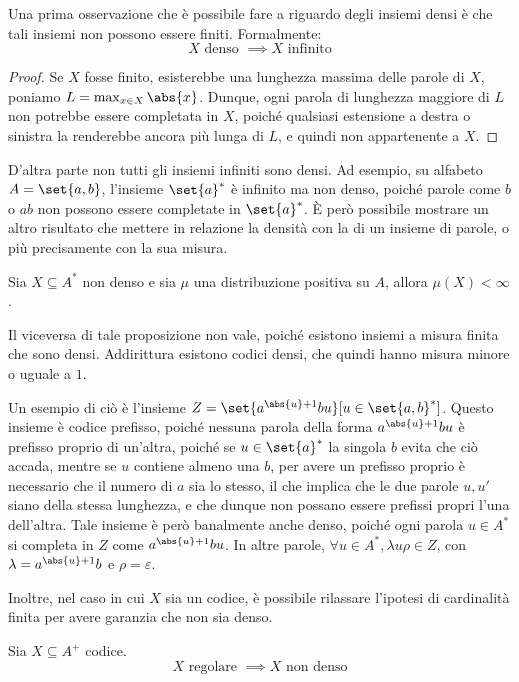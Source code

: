 Una prima osservazione che è possibile fare a riguardo degli insiemi densi è che tali insiemi non possono essere finiti.
Formalmente:
\[X \text{ denso } \implies X \text{ infinito}\]
\begin{proof}
  Se \(X\) fosse finito, esisterebbe una lunghezza massima delle parole di \(X\), poniamo \(L = \max_{x \in X} \abs{x}\).
  Dunque, ogni parola di lunghezza maggiore di \(L\) non potrebbe essere completata in \(X\), poiché qualsiasi estensione a destra o sinistra la renderebbe ancora più lunga di \(L\), e quindi non appartenente a \(X\).
\end{proof}

D'altra parte non tutti gli insiemi infiniti sono densi. Ad esempio, su alfabeto \(A = \set{a,b}\), l'insieme \(\set{a}^*\) è infinito ma non denso, poiché parole come \(b\) o \(ab\) non possono essere completate in \(\set{a}^*\).
È però possibile mostrare un altro risultato che mettere in relazione la densità con la  di un insieme di parole, o più precisamente con la sua misura.

\begin{proposition}{}
  Sia \(X \subseteq A^*\) non denso e sia \(\mu\) una distribuzione positiva su \(A\), allora \(\mu(X) < \infty\).
\end{proposition}

Il viceversa di tale proposizione non vale, poiché esistono insiemi a misura finita che sono densi. Addirittura esistono codici densi, che quindi hanno misura minore o uguale a \(1\).

\begin{example}[label=ex:dense_code]{}
  Un esempio di ciò è l'insieme \(Z = \set{a^{\abs{u}+1}bu}[u \in \set{a,b}^*]\). Questo insieme è codice prefisso, poiché nessuna parola della forma \(a^{\abs{u}+1}bu\) è prefisso proprio di un'altra,
  poiché se \(u \in \set{a}^*\) la singola \(b\) evita che ciò accada, mentre se \(u\) contiene almeno una \(b\), per avere un prefisso proprio è necessario che il numero di \(a\) sia lo stesso, il che implica che le due parole \(u, u'\) siano della stessa lunghezza, e che dunque non possano essere prefissi propri l'una dell'altra.
  Tale insieme è però banalmente anche denso, poiché ogni parola \(u \in A^*\) si completa in \(Z\) come \(a^{\abs{u}+1}bu\). In altre parole, \(\forall u \in A^*, \lambda u \rho \in Z\), con \(\lambda = a^{\abs{u}+1}b\) e \(\rho = \varepsilon\).
\end{example}

Inoltre, nel caso in cui \(X\) sia un codice, è possibile rilassare l'ipotesi di cardinalità finita per avere garanzia che non sia denso.
\begin{proposition}{}
  Sia \(X \subseteq A^+\) codice.
  \[ X \text{ regolare } \implies X \text{ non denso}\]
\end{proposition}

